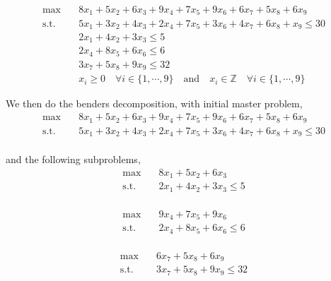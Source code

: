 \documentclass[11pt]{article}
\begin{document}
\begin{align}
    \text{max} & \quad 8 x_1+5 x_2+6 x_3+9 x_4+7 x_5+9 x_6+6 x_7+5 x_8  + 6 x_9 \nonumber \\ 
    \text{s.t.} & \quad 5 x_1+ 3 x_2+4 x_3+2 x_4+7 x_5+3 x_6+4 x_7+6 x_8 + x_9 \leq 30 \nonumber \\
    &\quad 2 x_1+4 x_2+3 x_3 \leq 5\nonumber\\ 
    & \quad  2x_4+8 x_5+6 x_6 \leq 6 \nonumber\\
    & \quad  3x_7+5 x_8+9 x_9 \leq 32 \nonumber\\
    & \quad x_i \geq 0 \quad \forall i \in \{1, \cdots,9\} \quad \text{and} \quad x_i \in \mathbb{Z} \quad \forall i \in \{1, \cdots,9\} \nonumber
    \end{align} \nonumber

    \noindent We then do the benders decomposition, with initial master problem,\\

\begin{align}
\text{max} & \quad 8 x_1+5 x_2+6 x_3+9 x_4+7 x_5+9 x_6+6 x_7+5 x_8  + 6 x_9 \nonumber \\ 
\text{s.t.} & \quad 5 x_1+ 3 x_2+4 x_3+2 x_4+7 x_5+3 x_6+4 x_7+6 x_8 + x_9 \leq 30 \nonumber \\
\end{align} \nonumber

\noindent and the following subproblems,\\

\begin{align}
\text{max} & \quad 8 x_1+5 x_2+6 x_3 \nonumber \\ 
\text{s.t.} & \quad 2 x_1+4 x_2+3 x_3 \leq 5 \nonumber \\
\end{align} \nonumber

\begin{align}
\text{max} & \quad 9 x_4+7 x_5+9 x_6 \nonumber \\ 
\text{s.t.} & \quad 2x_4+8 x_5+6 x_6 \leq 6 \nonumber \\
\end{align} \nonumber

\begin{align}
\text{max} & \quad 6 x_7+5 x_8  + 6 x_9  \nonumber \\ 
\text{s.t.} & \quad 3x_7+5 x_8+9 x_9 \leq 32 \nonumber \\
\end{align} \nonumber
\end{document}
